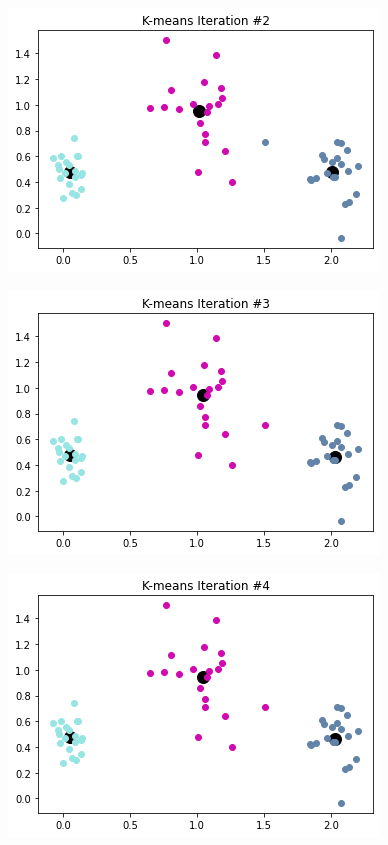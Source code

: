 \documentclass[11pt]{article}
\begin{document}
\begin{center}
    \includegraphics[scale=0.6]{2d-2.png}
\end{center}

\begin{center}
    \includegraphics[scale=0.6]{2d-3.png}
\end{center}

\begin{center}
    \includegraphics[scale=0.6]{2d-4.png}
\end{center}
\end{document}
